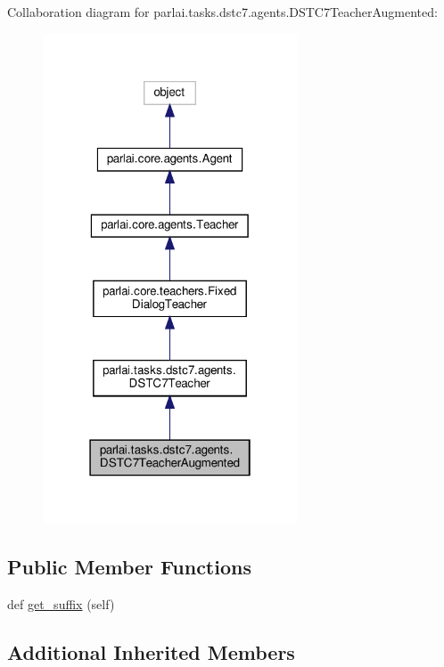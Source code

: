 Collaboration diagram for parlai.\+tasks.\+dstc7.\+agents.\+D\+S\+T\+C7\+Teacher\+Augmented\+:
\nopagebreak
\begin{figure}[H]
\begin{center}
\leavevmode
\includegraphics[width=214pt]{dd/d68/classparlai_1_1tasks_1_1dstc7_1_1agents_1_1DSTC7TeacherAugmented__coll__graph}
\end{center}
\end{figure}
\subsection*{Public Member Functions}
\begin{DoxyCompactItemize}
\item 
def \hyperlink{classparlai_1_1tasks_1_1dstc7_1_1agents_1_1DSTC7TeacherAugmented_aa14c386712516ba60af7af0ee7cadbf5}{get\+\_\+suffix} (self)
\end{DoxyCompactItemize}
\subsection*{Additional Inherited Members}


